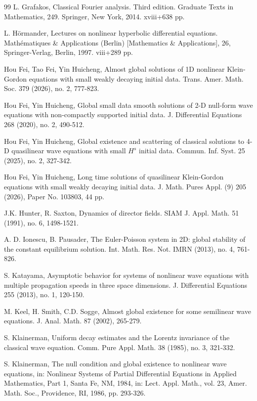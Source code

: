 \documentclass[11pt,twoside]{article}
\theoremstyle{plain}
\theoremstyle{definition}
\numberwithin{equation}{section}
\begin{document}
\begin{thebibliography}{99}
 L. Grafakos, Classical Fourier analysis. Third edition. Graduate Texts in Mathematics, 249.
Springer, New York, 2014. xviii+638 pp.


 L. H\"{o}rmander,  Lectures on nonlinear hyperbolic differential equations. Math\'ematiques \& Applications (Berlin)
[Mathematics \& Applications], 26, Springer-Verlag, Berlin, 1997. viii+289 pp.

 Hou Fei, Tao Fei, Yin Huicheng, Almost global solutions of 1D nonlinear Klein-Gordon equations with small weakly decaying initial data. Trans. Amer. Math. Soc. 379 (2026), no. 2, 777-823.

 Hou Fei, Yin Huicheng, Global small data smooth solutions of 2-D null-form wave equations with non-compactly supported initial data. J. Differential Equations 268 (2020), no. 2, 490-512.


 Hou Fei, Yin Huicheng, Global existence and scattering of classical solutions to 4-D quasilinear wave equations with small $H^s$ initial data. Commun. Inf. Syst. 25 (2025), no. 2, 327-342.

 Hou Fei, Yin Huicheng, Long time solutions of quasilinear Klein-Gordon equations with small weakly decaying initial data.
 J. Math. Pures Appl. (9) 205 (2026), Paper No. 103803, 44 pp.


 J.K. Hunter, R. Saxton, Dynamics of director fields.  SIAM J. Appl. Math. 51 (1991),
no. 6, 1498-1521.

 A. D. Ionescu, B. Pausader,  The Euler-Poisson system in 2D: global stability of the constant equilibrium solution.
Int. Math. Res. Not. IMRN (2013), no. 4, 761-826.

 S. Katayama, Asymptotic behavior for systems of nonlinear wave equations with multiple propagation
speeds in three space dimensions. J. Differential Equations 255 (2013), no. 1, 120-150.


M. Keel, H. Smith, C.D. Sogge,  Almost global existence for some semilinear wave equations.
J. Anal. Math. 87 (2002), 265-279.




 S. Klainerman, Uniform decay estimates and the Lorentz invariance of the classical wave equation.
Comm. Pure Appl. Math. 38 (1985), no. 3, 321-332.

 S. Klainerman, The null condition and global existence to nonlinear wave equations, in: Nonlinear Systems of Partial Differential Equations in Applied Mathematics, Part 1, Santa Fe, NM, 1984, in: Lect. Appl. Math., vol. 23, Amer. Math. Soc., Providence, RI, 1986, pp. 293-326.


\end{thebibliography}
\end{document}
